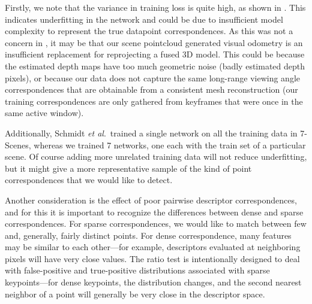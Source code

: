 Firstly, we note that the variance in training loss is quite high, as shown in . This indicates underfitting in the network and could be due to insufficient model complexity to represent the true datapoint correspondences. As this was not a concern in \cite{schmidt2017self}, it may be that our scene pointcloud generated visual odometry is an insufficient replacement for reprojecting a fused 3D model. This could be because the estimated depth maps have too much geometric noise (badly estimated depth pixels), or because our data does not capture the same long-range viewing angle correspondences that are obtainable from a consistent mesh reconstruction (our training correspondences are only gathered from keyframes that were once in the same active window).

Additionally, Schmidt \textit{et al}.\ trained a single network on all the training data in 7-Scenes, whereas we trained 7 networks, one each with the train set of a particular scene. Of course adding more unrelated training data will not reduce underfitting, but it might give a more representative sample of the kind of point correspondences that we would like to detect.

Another consideration is the effect of poor pairwise descriptor correspondences, and for this it is important to recognize the differences between dense and sparse correspondences. For sparse correspondences, we would like to match between few and, generally, fairly distinct points. For dense correspondence, many features may be similar to each other---for example, descriptors evaluated at neighboring pixels will have very close values. The ratio test is intentionally designed to deal with false-positive and true-positive distributions associated with sparse keypoints---for dense keypoints, the distribution changes, and the second nearest neighbor of a point will generally be very close in the descriptor space.

